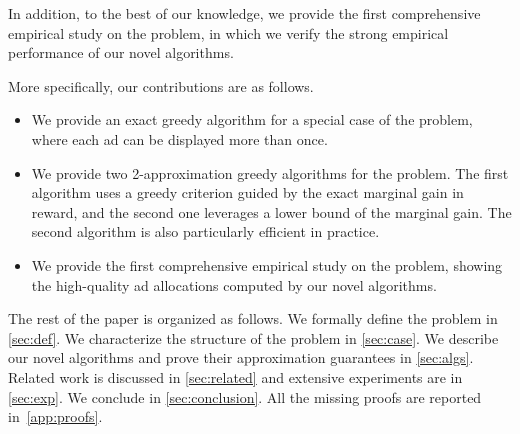 In addition, to the best of our knowledge, 
we provide the first comprehensive empirical study on the \streamads problem,
in which we verify the strong empirical performance of our novel algorithms. %

More specifically, our contributions are as follows.
\begin{itemize}
	\item We provide an exact greedy algorithm for a special case of the \streamads problem, 
	where each ad can be displayed more than once.
	\item We provide two 2-approximation greedy algorithms for the \streamads problem.
	The first algorithm uses a greedy criterion guided by the exact marginal gain in reward,
	and the second one leverages a lower bound of the marginal gain.
	The second algorithm is also particularly efficient in practice.
	\item We provide the first comprehensive empirical study on the \streamads problem, showing the high-quality ad allocations computed by our novel algorithms.
\end{itemize}


The rest of the paper is organized as follows.
We formally define the problem in \cref{sec:def}.
We characterize the structure of the problem in 
\cref{sec:case}.
We describe our novel algorithms and prove their approximation guarantees in \cref{sec:algs}.
Related work is discussed in \cref{sec:related} and
extensive experiments are in \cref{sec:exp}.
We conclude in \cref{sec:conclusion}. All the missing proofs are reported in~\cref{app:proofs}.


